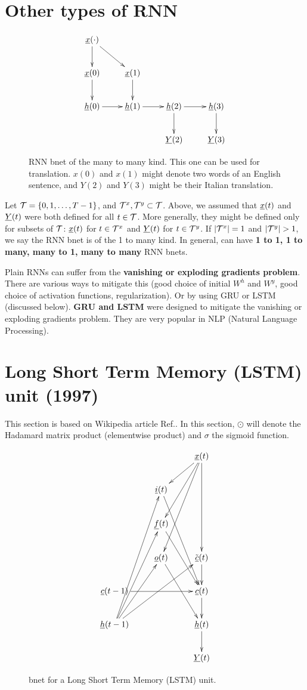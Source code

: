  
\section*{Other types of RNN}

\begin{figure}[h!]
\centering
$$\xymatrix{
\rvx(\cdot)\ar[d]\ar[dr]\\
\rvx(0)\ar[d]&
\rvx(1)\ar[d]&
\\
\rvh(0)\ar[r]&
\rvh(1)\ar[r]&
\rvh(2)\ar[d]\ar[r]&
\rvh(3)\ar[d]\\
&
&
\rvY(2)&
\rvY(3)
}$$
\caption{RNN bnet of the
many to many kind. This
one can be used for  translation.
$x(0)$ and $x(1)$ might
denote two words of an English
sentence, and $Y(2)$ 
and $Y(3)$ might be
their Italian translation.}
\label{fig-rnn-translation}
\end{figure}

Let ${\cal T}=\{0,1, \dots , T-1\}$,
and
${\cal T}^x, {\cal T}^y\subset {\cal T}$.
Above, 
we assumed that 
${\underline{x}}(t)$ and ${\underline{Y}}(t)$
were both defined 
for all $t\in {\cal T}$.
More generally, they 
might be defined only
for subsets of ${\cal T}$:
${\underline{x}}(t)$ for $t\in {\cal T}^x$
and 
${\underline{Y}}(t)$ for $t\in {\cal T}^y$.
If $|{\cal T}^x|=1$ and
$|\calt^y|>1$, 
we say the RNN bnet is of
the 1 to many kind.
In general, can have 
{\bf 1 to 1, 1 to many, many to 1, 
many to many} RNN bnets.

Plain RNNs can suffer 
from the
{\bf vanishing or exploding
 gradients problem}.
There are various ways to
mitigate this (good choice of initial
$W^h$ and $W^y$, 
good choice of activation 
functions, regularization).
Or by using GRU or LSTM (discussed below).
 {\bf GRU and LSTM}
were designed to mitigate the
vanishing or exploding gradients problem.
They are very popular in NLP (Natural
Language Processing).



\newpage

\section*{Long  
Short Term Memory (LSTM) unit (1997)}

This section
is based on Wikipedia article 
Ref.\cite{lstm}. In this section,
$\odot$
will denote the Hadamard matrix product
(elementwise product)  
and $\sigma$ the sigmoid function.

\begin{figure}[h!]
\centering
$$\xymatrix{
&&\rvx(t)\ar[ddd]\ar[dl]\ar[ldd]\ar[lddd]
\\
&\rvi(t)\ar[rddd]
&\\
&\rvf(t)\ar[rdd]&\\
&\rvo(t)\ar[ddr]
&\tilde{\rvc}(t)\ar[d]
\\
\rvc(t-1)\ar[rr]
&&\rvc(t)\ar[d]
\\
\rvh(t-1)\ar[ruuuu]\ar[ruuu]\ar[ruu]\ar[rruu]
&&\rvh(t)\ar[d]\\
&&\rvY(t)
}$$
\caption{
bnet for a Long Short Term Memory
 (LSTM) unit.}
\label{fig-rnn-lstm}
\end{figure}

